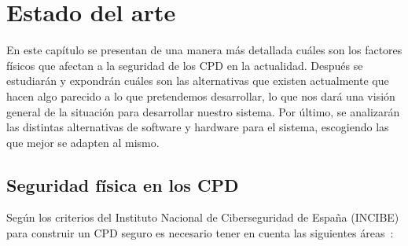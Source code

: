 \chapter{Estado del arte}
\label{ch:estado}
En este capítulo se presentan de una manera más detallada cuáles son los factores físicos que afectan a la seguridad de los CPD en la actualidad. Después se estudiarán y expondrán cuáles son las alternativas que existen actualmente que hacen algo parecido a lo que pretendemos desarrollar, lo que nos dará una visión general de la situación para desarrollar nuestro sistema. Por último, se analizarán las distintas alternativas de software y hardware para el sistema, escogiendo las que mejor se adapten al mismo.

\section{Seguridad física en los CPD}\label{sec:seguridad_fisica_CPD}
Según los criterios del Instituto Nacional de Ciberseguridad de España (INCIBE) para construir un CPD seguro es necesario tener en cuenta las siguientes áreas~\cite{noauthor_pon_2015}:
